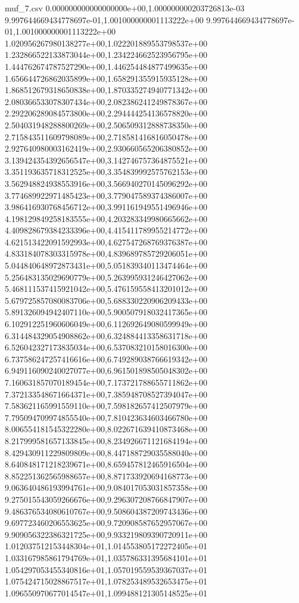 \begin{filecontents*}{muf_7.csv}
0.000000000000000000e+00,1.000000000203726813e-03
9.997644669434778697e-01,1.001000000001113222e+00
9.997644669434778697e-01,1.001000000001113222e+00
1.020956267980138277e+00,1.022201889553798537e+00
1.232866522133873044e+00,1.234224662523956795e+00
1.444762674787527290e+00,1.446254484877499635e+00
1.656644726862035899e+00,1.658291355915935128e+00
1.868512679318650838e+00,1.870335274940771342e+00
2.080366533078307434e+00,2.082386241249878367e+00
2.292206289084573800e+00,2.294444254136578820e+00
2.504031948288800269e+00,2.506509312888738350e+00
2.715843511609798089e+00,2.718581416816050478e+00
2.927640980003162419e+00,2.930660565206380852e+00
3.139424354392656547e+00,3.142746757364875521e+00
3.351193635718312525e+00,3.354839992575762153e+00
3.562948824938553916e+00,3.566940270145096292e+00
3.774689922971485423e+00,3.779047589374386007e+00
3.986416930768456712e+00,3.991161949551496946e+00
4.198129849258183555e+00,4.203283349980665662e+00
4.409828679384233396e+00,4.415411789955214772e+00
4.621513422091592993e+00,4.627547268769376387e+00
4.833184078303315978e+00,4.839689785729206051e+00
5.044840648972873431e+00,5.051839340113474464e+00
5.256483135029690779e+00,5.263995931246427062e+00
5.468111537415921042e+00,5.476159558413201012e+00
5.679725857080083706e+00,5.688330220906209433e+00
5.891326094942407110e+00,5.900507918032417365e+00
6.102912251960606049e+00,6.112692649080599949e+00
6.314484329054908862e+00,6.324884413358631718e+00
6.526042327173835034e+00,6.537083210158016300e+00
6.737586247257416616e+00,6.749289038766619342e+00
6.949116090240027077e+00,6.961501898505048302e+00
7.160631857070189454e+00,7.173721788655711862e+00
7.372133548671664371e+00,7.385948708527394047e+00
7.583621165991559110e+00,7.598182657412507979e+00
7.795094709974855540e+00,7.810423634603466780e+00
8.006554181545322280e+00,8.022671639410873468e+00
8.217999581657133845e+00,8.234926671121684194e+00
8.429430911229809809e+00,8.447188729035588040e+00
8.640848171218239671e+00,8.659457812465916504e+00
8.852251362565988657e+00,8.871733920694168773e+00
9.063640486193994761e+00,9.084017053031857358e+00
9.275015543059266676e+00,9.296307208766847907e+00
9.486376534080610767e+00,9.508604387209743436e+00
9.697723460206553625e+00,9.720908587652957067e+00
9.909056322386321725e+00,9.933219809390720911e+00
1.012037512153448304e+01,1.014553805172272405e+01
1.033167985861794769e+01,1.035786331395684101e+01
1.054297053455340816e+01,1.057019559539367037e+01
1.075424715028867517e+01,1.078253489532653475e+01
1.096550970677014547e+01,1.099488121305148525e+01

\end{filecontents*}
